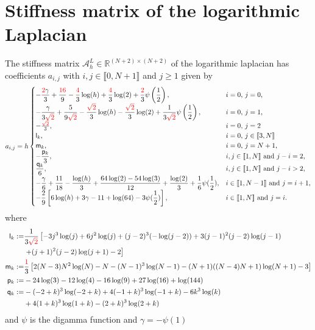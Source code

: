 \documentclass[11 pt]{article}
\newcommand\inter[1]{\llbracket #1\rrbracket}
\numberwithin{equation}{section}
\def\R{\mathbb{R}}
\newcommand{\B}[1]{{\color{red} #1}}  %
\begin{document}
\section{Stiffness matrix of the logarithmic Laplacian}\label{sec:s:m:log}

The stiffness matrix $\mathcal A_{h}^{L}\in{\R^{(N+2)\times(N+2)}}$ of the logarithmic laplacian has coefficients $a_{i,j}$ with $i,j\in\inter{0,N+1}$ and $j\geq 1$ given by
%
\begin{equation}\label{stiff:LogLap}
a_{i,j}= h
\begin{cases}
\displaystyle -\frac{\B{2} \gamma }{3}+\frac{\B{16}}{9}-\frac{\B{4}}{3}  \log (h)+\frac{\B{4}}{3}  \log
   (2)+\frac{\B{2}}{3}  \psi \left(\frac{1}{2}\right), & \textnormal{$i=0$, $j=0$,} \\
\displaystyle -\frac{\gamma }{3\B{\sqrt{2}}}+\frac{5}{9\B{\sqrt{2}}}-\frac{\B{\sqrt{2}}}{3} \log (h)-\frac{\B{\sqrt{2}}}{3}  \log
   (2)+\frac{1}{3\B{\sqrt{2}}} \psi \left(\frac{1}{2}\right), & \textnormal{$i=0$, $j=1$,} \\
   -\frac{\B{\sqrt {2}}}{3},
 & \parbox[t]{.3\columnwidth}{$i=0$, $j=2$}\\
 \mathsf{l}_k, 
 & \parbox[t]{.3\columnwidth}{$i=0$, $j\in\inter{3,N}$}\\
 \mathsf{m}_k, &  \parbox[t]{.3\columnwidth}{$i=0$, $j=N+1$,}\\
\displaystyle -\frac{\mathsf p_k}{3}, & \textnormal{$i,j\in\inter{1,N}$ and $j-i=2$,} \\
\displaystyle \frac{\mathsf q_k}{6}, & \textnormal{$i,j\in\inter{1,N}$ and $j-i> 2$,} \\
\displaystyle -\frac{\gamma}{6} + \frac{11}{18} - \frac{\log(h)}{3}  + \frac{64\log(2) - 54\log(3)}{12} + \frac{\log(2)}{3}  + \frac{1}{6} \psi(\frac 12), & \textnormal{$i\in\inter{1,N-1}$ and $j=i+1$,} \\
\displaystyle -\frac{2}{9}\left[6\log(h) + 3\gamma - 11 + \log(64) - 3\psi(\frac12)\right], & \textnormal{$i\in\inter{1,N}$ and $j=i$.}
\end{cases}
\end{equation}
%
where 
%
\begin{align} \notag
\mathsf{l}_k:= & \frac{1}{3\B{\sqrt{2}}}  \left[-3 j^3 \log (j)+6 j^2 \log (j)+(j-2)^3 (-\log (j-2))+3
   (j-1)^2 (j-2) \log (j-1) \right. \\
   &\left. +(j+1)^2 (j-2) \log (j+1)-2\right] \\
   \mathsf{m}_k:= & \frac{\B{1}}{3}\left[2 (N-3) N^2 \log (N)-N-(N-1)^3 \log (N-1)-(N+1) ((N-4) N+1) \log (N+1)-3\right] \\
\mathsf{p}_k:=&  -24\log(3) - 12\log(4) - 16\log(9) + 27\log(16) + \log(144) \\ \notag
\mathsf{q}_k:=&-(-2 + k)^3\log(-2 + k) + 4(-1 + k)^3\log(-1 + k) - 6 k^3 \log(k)  \\
&+4(1 + k)^3\log(1 + k) - (2 + k)^3\log(2 + k)
\end{align}
and $\psi$ is the digamma function and $\gamma=-\psi(1)$
\end{document}
